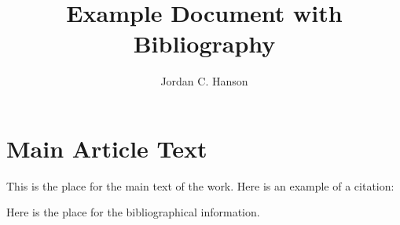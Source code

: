 \documentclass{article}
\begin{document}
\title{Example Document with Bibliography}
\author{Jordan C. Hanson}

\maketitle

\section{Main Article Text}

This is the place for the main text of the work.  Here is an example of a citation: \cite{c1}

\begin{thebibliography}{5}
 Here is the place for the bibliographical information.
\end{thebibliography}
\end{document}
